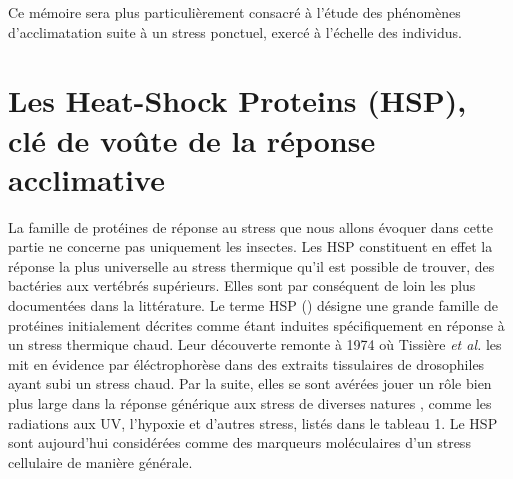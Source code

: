 Ce mémoire sera plus particulièrement consacré à l’étude des
phénomènes
d'acclimatation suite à un stress ponctuel, exercé à l'échelle des individus.



%			

		\section{Les Heat-Shock Proteins (HSP), clé de voûte de la réponse acclimative} %
		\label{sec:generalites_HSP}
%			

La famille de protéines de réponse au stress que nous allons évoquer dans cette partie ne concerne pas uniquement les insectes.
Les HSP constituent en effet la réponse la plus universelle au stress thermique qu'il est possible de trouver, des bactéries aux vertébrés supérieurs.
Elles sont par conséquent de loin les plus documentées dans la littérature.
Le terme HSP () désigne une grande famille de
protéines initialement décrites comme étant induites spécifiquement en réponse à un
stress thermique chaud.
Leur découverte \cite{tissieres1974} remonte à 1974 où Tissière \textit{et al.} les mit en évidence par éléctrophorèse dans des extraits tissulaires de drosophiles ayant subi un stress chaud.
Par la suite, elles se sont avérées jouer un rôle bien
plus large\cite{zhang2011} dans la réponse générique aux stress de diverses
natures \cite{sorensen2003}, comme les radiations aux UV, l'hypoxie et d'autres stress, listés dans le tableau 1.
Le HSP sont aujourd'hui considérées comme des marqueurs moléculaires d'un stress cellulaire de manière générale.


